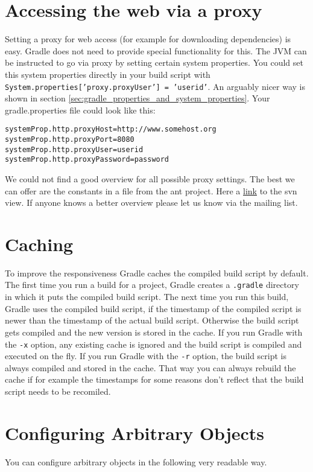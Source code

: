 \section{Accessing the web via a proxy} %
\label{sec:accessing_the_web_via_a_proxy}
Setting a proxy for web access (for example for downloading dependencies) is easy. Gradle does not need to provide special functionality for this. The JVM can be instructed to go via proxy by setting certain system properties. You could set this system properties directly in your build script with \texttt{System.properties['proxy.proxyUser'] = 'userid'}. An arguably nicer way is shown in section \ref{sec:gradle_properties_and_system_properties}. Your gradle.properties file could look like this:
\begin{Verbatim}
systemProp.http.proxyHost=http://www.somehost.org
systemProp.http.proxyPort=8080
systemProp.http.proxyUser=userid
systemProp.http.proxyPassword=password	
\end{Verbatim}
We could not find a good overview for all possible proxy settings. The best we can offer are the constants in a file from the ant project. Here a \href{http://svn.apache.org/viewvc/ant/core/trunk/src/main/org/apache/tools/ant/util/ProxySetup.java?view=markup&pathrev=556977}{link} to the svn view. If anyone knows a better overview please let us know via the mailing list.  

\section{Caching} %
\label{sec:caching}
To improve the responsiveness Gradle caches the compiled build script by default. The first time you run a build for a project, Gradle creates a \texttt{.gradle} directory in which it puts the compiled build script. The next time you run this build, Gradle uses the compiled build script, if the timestamp of the compiled script is newer than the timestamp of the actual build script. Otherwise the build script gets compiled and the new version is stored in the cache. If you run Gradle with the \texttt{-x} option, any existing cache is ignored and the build script is compiled and executed on the fly. If you run Gradle with the \texttt{-r} option, the build script is always compiled and stored in the cache. That way you can always rebuild the cache if for example the timestamps for some reasons don't reflect that the build script needs to be recomiled. 

\section{Configuring Arbitrary Objects} %
\label{sec:configuring_arbitrary_objects}
You can configure arbitrary objects in the following very readable way.


